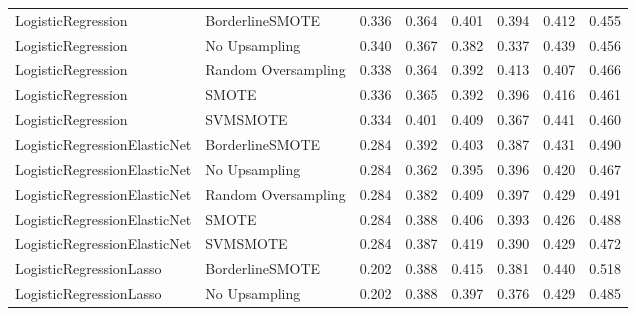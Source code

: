 \begin{tabular}{llllllll}
          LogisticRegression &     BorderlineSMOTE & 0.336 &                     0.364 &                 0.401 &                  0.394 &                                   0.412 &     0.455 \\
          LogisticRegression &       No Upsampling & 0.340 &                     0.367 &                 0.382 &                  0.337 &                                   0.439 &     0.456 \\
          LogisticRegression & Random Oversampling & 0.338 &                     0.364 &                 0.392 &                  0.413 &                                   0.407 &     0.466 \\
          LogisticRegression &               SMOTE & 0.336 &                     0.365 &                 0.392 &                  0.396 &                                   0.416 &     0.461 \\
          LogisticRegression &            SVMSMOTE & 0.334 &                     0.401 &                 0.409 &                  0.367 &                                   0.441 &     0.460 \\
LogisticRegressionElasticNet &     BorderlineSMOTE & 0.284 &                     0.392 &                 0.403 &                  0.387 &                                   0.431 &     0.490 \\
LogisticRegressionElasticNet &       No Upsampling & 0.284 &                     0.362 &                 0.395 &                  0.396 &                                   0.420 &     0.467 \\
LogisticRegressionElasticNet & Random Oversampling & 0.284 &                     0.382 &                 0.409 &                  0.397 &                                   0.429 &     0.491 \\
LogisticRegressionElasticNet &               SMOTE & 0.284 &                     0.388 &                 0.406 &                  0.393 &                                   0.426 &     0.488 \\
LogisticRegressionElasticNet &            SVMSMOTE & 0.284 &                     0.387 &                 0.419 &                  0.390 &                                   0.429 &     0.472 \\
     LogisticRegressionLasso &     BorderlineSMOTE & 0.202 &                     0.388 &                 0.415 &                  0.381 &                                   0.440 &     0.518 \\
     LogisticRegressionLasso &       No Upsampling & 0.202 &                     0.388 &                 0.397 &                  0.376 &                                   0.429 &     0.485 \\

\end{tabular}
